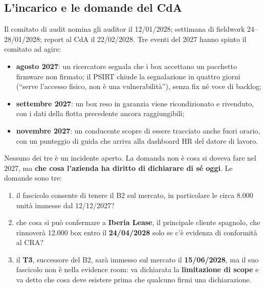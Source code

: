 \subsection{L'incarico e le domande del CdA}
Il comitato di audit nomina gli auditor il 12/01/2028; settimana di fieldwork 24--28/01/2028; report
al CdA il 22/02/2028. Tre eventi del 2027 hanno spinto il comitato ad agire:
\begin{itemize}
  \item \textbf{agosto 2027}: un ricercatore segnala che i box accettano un pacchetto firmware non
    firmato; il PSIRT chiude la segnalazione in quattro giorni (``serve l'accesso fisico, non è una
    vulnerabilità''), senza fix né voce di backlog;
  \item \textbf{settembre 2027}: un box reso in garanzia viene ricondizionato e rivenduto, con i dati
    della flotta precedente ancora raggiungibili;
  \item \textbf{novembre 2027}: un conducente scopre di essere tracciato anche fuori orario, con un
    punteggio di guida che arriva alla dashboard HR del datore di lavoro.
\end{itemize}
Nessuno dei tre è un incidente aperto. La domanda non è cosa si doveva fare nel 2027, ma
\textbf{che cosa l'azienda ha diritto di dichiarare di sé oggi}. Le domande sono tre:
\begin{enumerate}
  \item il fascicolo consente di tenere il B2 sul mercato, in particolare le circa 8.000 unità
    immesse dal 12/12/2027?
  \item che cosa si può confermare a \textbf{Iberia Lease}, il principale cliente spagnolo, che
    rinnoverà 12.000 box entro il \textbf{24/04/2028} solo se c'è evidenza di conformità al CRA?
  \item il \textbf{T3}, successore del B2, sarà immesso sul mercato il \textbf{15/06/2028}, ma il suo
    fascicolo non è nella evidence room: va dichiarata la \textbf{limitazione di scope} e va detto che
    cosa deve esistere prima che qualcuno firmi una dichiarazione.
\end{enumerate}

